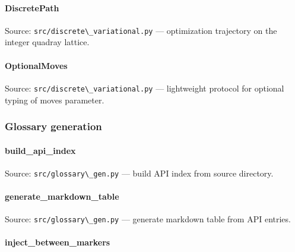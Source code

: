 \documentclass[
  10pt,
]{article}
\newcommand{\passthrough}[1]{#1}
\renewcommand{\texttt}[1]{%
    \colorbox{codebg}{\color{codefg}\ttfamily #1}%
}
\begin{document}
\hypertarget{code:DiscretePath}{%
\paragraph{\texorpdfstring{\texttt{DiscretePath}}{DiscretePath}}\label{code:DiscretePath}}

Source: \passthrough{\lstinline!src/discrete\_variational.py!} ---
optimization trajectory on the integer quadray lattice.

\hypertarget{code:OptionalMoves}{%
\paragraph{\texorpdfstring{\texttt{OptionalMoves}}{OptionalMoves}}\label{code:OptionalMoves}}

Source: \passthrough{\lstinline!src/discrete\_variational.py!} ---
lightweight protocol for optional typing of moves parameter.

\hypertarget{code:glossary}{%
\subsubsection{Glossary generation}\label{code:glossary}}

\hypertarget{code:build_api_index}{%
\paragraph{\texorpdfstring{\texttt{build\_api\_index}}{build\_api\_index}}\label{code:build_api_index}}

Source: \passthrough{\lstinline!src/glossary\_gen.py!} --- build API
index from source directory.

\hypertarget{code:generate_markdown_table}{%
\paragraph{\texorpdfstring{\texttt{generate\_markdown\_table}}{generate\_markdown\_table}}\label{code:generate_markdown_table}}

Source: \passthrough{\lstinline!src/glossary\_gen.py!} --- generate
markdown table from API entries.

\hypertarget{code:inject_between_markers}{%
\paragraph{\texorpdfstring{\texttt{inject\_between\_markers}}{inject\_between\_markers}}\label{code:inject_between_markers}}
\end{document}
